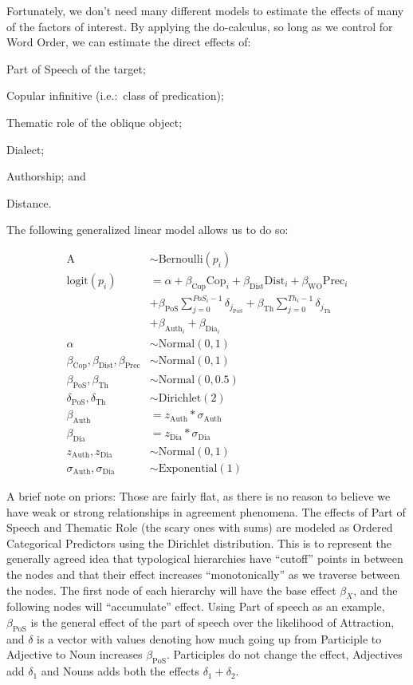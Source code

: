 \documentclass[a4paper, 12pt, article]{memoir}
\begin{document}
Fortunately, we don't need many different models to estimate the effects of many
of the factors of interest.
By applying the do-calculus, so long as we control for Word Order, we can
estimate the direct effects of:
\begin{inparaenum}
	\item Part of Speech of the target;
	\item Copular infinitive (i.e.:\ class of predication);
	\item Thematic role of the oblique object;
	\item Dialect;
	\item Authorship; and
	\item Distance.
\end{inparaenum}
The following generalized linear model allows us to do so:

\begin{align*}
	\text{A} &\sim \text{Bernoulli}(p_i)\\
	\text{logit}(p_i) &= \alpha + 
	\beta_{\text{Cop}}\text{Cop}_i + 
	\beta_{\text{Dist}}\text{Dist}_i + \beta_{\text{WO}} \text{Prec}_i \\&+
	\beta_{\text{PoS}}\sum^{PoS_{i}-1}_{j=0}{\delta_{j_{\text{PoS}}}} + \beta_{\text{Th}}\sum^{Th_{i}-1}_{j=0}{\delta_{j_{\text{Th}}}} \\&+
		\beta_{\text{Auth}_{i}} + \beta_{\text{Dia}_i}\\
	\alpha &\sim \text{Normal}(0, 1)\\
	\beta_{\text{Cop}}, \beta_{\text{Dist}}, \beta_{\text{Prec}} &\sim \text{Normal}(0, 1)\\
	\beta_{\text{PoS}}, \beta_{\text{Th}} &\sim \text{Normal}(0, 0.5)\\
	\delta_{\text{PoS}}, \delta_{\text{Th}} &\sim \text{Dirichlet}(2)\\
	\beta_{\text{Auth}} &= z_{\text{Auth}}*\sigma_{\text{Auth}}\\
	\beta_{\text{Dia}} &= z_{\text{Dia}}*\sigma_{\text{Dia}}\\
	z_{\text{Auth}}, z_{\text{Dia}} &\sim \text{Normal}(0,1)\\
	\sigma_{\text{Auth}}, \sigma_{\text{Dia}} &\sim \text{Exponential}(1)
\end{align*}

A brief note on priors:
Those are fairly flat, as there is no reason to believe we have weak or
strong relationships in agreement phenomena.
The effects of Part of Speech and Thematic Role (the scary ones with sums) are
modeled as Ordered Categorical Predictors using the Dirichlet distribution.
This is to represent the generally agreed idea that typological hierarchies have
``cutoff'' points in between the nodes and that their effect increases
``monotonically'' as we traverse between the nodes.
The first node of each hierarchy will have the base effect $\beta_{X}$, and the
following nodes will ``accumulate'' effect. Using Part of speech as an example,
$\beta_{\text{PoS}}$ is the general effect of the part of speech over the
likelihood of Attraction, and $\delta$ is a vector with values denoting how much
going up from Participle to Adjective to Noun increases $\beta_{\text{PoS}}$.
Participles do not change the effect, Adjectives add $\delta_1$ and Nouns adds
both the effects $\delta_1 + \delta_2$.
\end{document}
